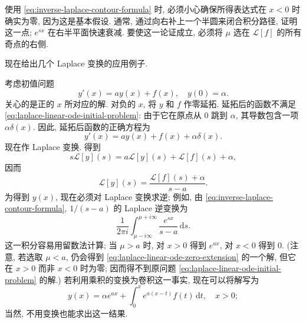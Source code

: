 使用 \eqref{eq:inverse-laplace-contour-formula} 时, 必须小心确保所得表达式在 $x<0$ 时确实为零, 因为这是基本假设. 通常, 通过向右补上一个半圆来闭合积分路径, 证明这一点; $e^{sx}$ 在右半平面快速衰减. 要使这一论证成立, 必须将 $\mu$ 选在 $\mathcal{L}[f]$ 的所有奇点的右侧.

现在给出几个 Laplace 变换的应用例子.

\begin{Example}
\label{ex:laplace-linear-ode}
考虑初值问题
\begin{equation}\label{eq:laplace-linear-ode-initial-problem}
y'(x)=ay(x)+f(x),\quad y(0)=\alpha.
\end{equation}
关心的是正的 $x$ 所对应的解. 对负的 $x$, 将 $y$ 和 $f$ 作零延拓. 延拓后的函数不满足 \eqref{eq:laplace-linear-ode-initial-problem}: 由于它在原点从 0 跳到 $\alpha$, 其导数包含一项 $\alpha\delta(x)$. 因此, 延拓后函数的正确方程为
\begin{equation}\label{eq:laplace-linear-ode-zero-extension}
y'(x)=ay(x)+f(x)+\alpha\delta(x).
\end{equation}
现在作 Laplace 变换. 得到
\begin{equation}\label{eq:laplace-linear-ode-transformed-equation}
s\mathcal{L}[y](s)=a\mathcal{L}[y](s)+\mathcal{L}[f](s)+\alpha,
\end{equation}
因而
\begin{equation}\label{eq:laplace-linear-ode-transform-solution}
\mathcal{L}[y](s)=\dfrac{\mathcal{L}[f](s)+\alpha}{s-a}.
\end{equation}
为得到 $y(x)$, 现在必须对 Laplace 变换求逆; 例如, 由 \eqref{eq:inverse-laplace-contour-formula}, $1/(s-a)$ 的 Laplace 逆变换为
\begin{equation}\label{eq:laplace-exponential-residue-integral}
\dfrac1{2\pi i}\int_{\mu-i\infty}^{\mu+i\infty}\dfrac{e^{sx}}{s-a}\,\mathrm{d}s.
\end{equation}
这一积分容易用留数法计算; 当 $\mu>a$ 时, 对 $x>0$ 得到 $e^{ax}$, 对 $x<0$ 得到 0. (注意, 若选取 $\mu<a$, 仍会得到 \eqref{eq:laplace-linear-ode-zero-extension} 的一个解, 但它在 $x>0$ 而非 $x<0$ 时为零; 因而得不到原问题 \eqref{eq:laplace-linear-ode-initial-problem} 的解.) 若利用乘积的变换为卷积这一事实, 现在可以将解写为
\begin{equation}\label{eq:laplace-linear-ode-causal-solution}
y(x)=\alpha e^{ax}+\int_0^xe^{a(x-t)}f(t)\,\mathrm{d}t,\quad x>0;
\end{equation}
当然, 不用变换也能求出这一结果.
\end{Example}
